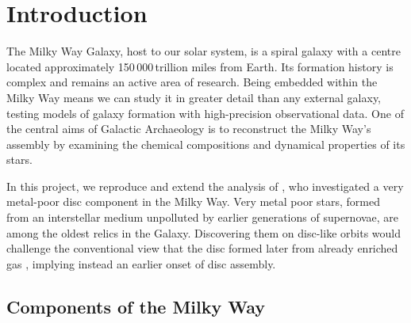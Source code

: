 \documentclass[a4paper,12pt]{article}
\begin{document}
\newpage

\listoffigures
\newpage
\listoftables
\newpage

\tableofcontents
\newpage


\section{Introduction}

The Milky Way Galaxy, host to our solar system, is a spiral galaxy with a centre 
located approximately 150\,000\,trillion miles from Earth. 
Its formation history is complex and remains an active area of research. Being embedded 
within the Milky Way means we can study it in greater detail than any external galaxy, 
testing models of galaxy formation with high-precision observational data. One of the 
central aims of Galactic Archaeology is to reconstruct the Milky Way’s assembly by 
examining the chemical compositions and dynamical properties of its stars.

In this project, we reproduce and extend the analysis of \citet{zhang2024existencemetalpoordiscmilky}, 
who investigated a very metal-poor disc component in the Milky Way. Very metal poor 
stars, formed from an interstellar medium unpolluted by earlier generations of 
supernovae, are among the oldest relics in the Galaxy. Discovering them on disc-like 
orbits would challenge the conventional view that the disc formed later from already 
enriched gas \citep{BlandHawthorn2016}, implying instead an earlier onset of disc 
assembly. 

\subsection{Components of the Milky Way}
\end{document}
